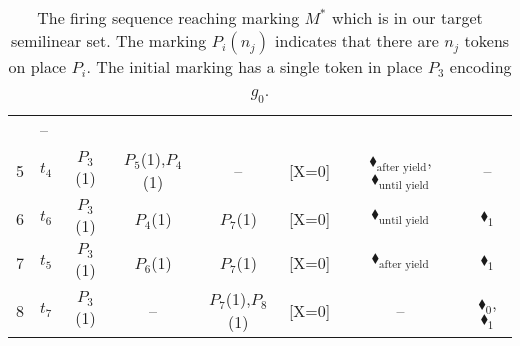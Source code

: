 \begin{table}[H]
{\begin{tabular}{c l c c c c c c}
			& --                                    \\
			5 & $t_4$                                  
			& {\color{blue}$P_3$(1)}                  
			& $P_5$(1),$P_4$(1)                          
			& --                                    
			&                                   {\color{blue}[X=0]}     
			&                                    {\color{black}$\blacklozenge_\text{after yield}$}, {\color{black}$\blacklozenge_\text{until yield}$}   
			& --                                    \\
			6 & $t_6$                     
			& {\color{blue}$P_3$(1)}                  
			& $P_4$(1)                                
			& {\color{red}$P_7$(1)}                    
			&                                      	{\color{blue}[X=0]}  
			&                                    {\color{black}$\blacklozenge_\text{until yield}$}   
			&                                   {\color{red}$\blacklozenge_1$}     \\
			7 & $t_5$                                  
			& {\color{blue}$P_3$(1)}                  
			& $P_6$(1)                                
			& {\color{red}$P_7$(1)}                    
			&                                   {\color{blue}[X=0]}    
			&                                    {\color{black}$\blacklozenge_\text{after yield}$}      
			&                                   {\color{red}$\blacklozenge_1$}        \\
			8 & $t_7$                     
			& {\color{blue}$P_3$(1)}                                  
			& --                                    
			& {\color{red}$P_7$(1),\color{red}$P_8$(1)}    
			&                                   {\color{blue}[X=0]}    
			&                                   --    
			&                                   {\color{red}$\blacklozenge_0$}, {\color{red}$\blacklozenge_1$}       \\
			\bottomrule
		\end{tabular}
	}
	\caption{The firing sequence reaching marking $M^*$ which is in our target semilinear set. The marking $P_i(n_j)$ indicates that there are $n_j$ tokens on place $P_i$. The initial marking has a single token in place $P_3$ encoding $g_0$.}
	\label{tab:PetriNetFiringCounterexample}
\end{table}

